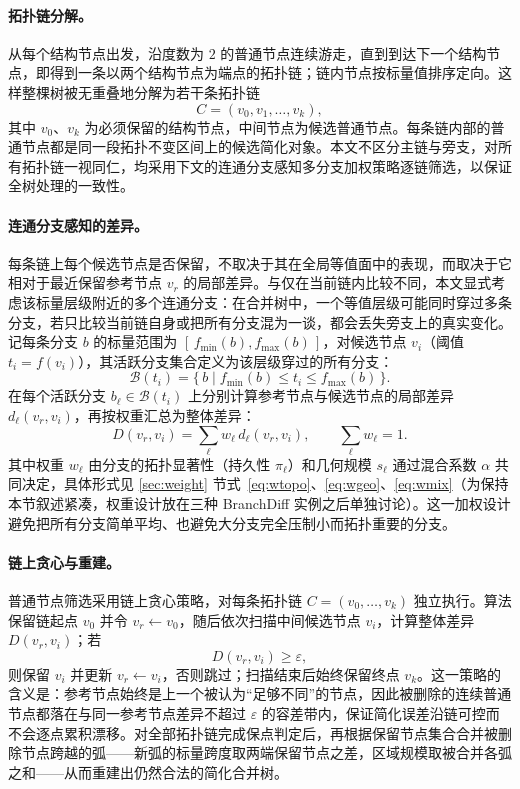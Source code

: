 \documentclass[twocolumn, a4paper, 10pt]{article}
\begin{document}
\paragraph{拓扑链分解。}从每个结构节点出发，沿度数为 $2$ 的普通节点连续游走，直到到达下一个结构节点，即得到一条以两个结构节点为端点的拓扑链；链内节点按标量值排序定向。这样整棵树被无重叠地分解为若干条拓扑链
\begin{equation}
C=(v_0,v_1,\ldots,v_k),
\end{equation}
其中 $v_0$、$v_k$ 为必须保留的结构节点，中间节点为候选普通节点。每条链内部的普通节点都是同一段拓扑不变区间上的候选简化对象。本文不区分主链与旁支，对所有拓扑链一视同仁，均采用下文的连通分支感知多分支加权策略逐链筛选，以保证全树处理的一致性。

\paragraph{连通分支感知的差异。}每条链上每个候选节点是否保留，不取决于其在全局等值面中的表现，而取决于它相对于最近保留参考节点 $v_r$ 的局部差异。与仅在当前链内比较不同，本文显式考虑该标量层级附近的多个连通分支：在合并树中，一个等值层级可能同时穿过多条分支，若只比较当前链自身或把所有分支混为一谈，都会丢失旁支上的真实变化。记每条分支 $b$ 的标量范围为 $[\,f_{\min}(b),f_{\max}(b)\,]$，对候选节点 $v_i$（阈值 $t_i=f(v_i)$），其活跃分支集合定义为该层级穿过的所有分支：
\begin{equation}
\mathcal{B}(t_i)=\{\,b\mid f_{\min}(b)\leq t_i\leq f_{\max}(b)\,\}.
\end{equation}
在每个活跃分支 $b_\ell\in\mathcal{B}(t_i)$ 上分别计算参考节点与候选节点的局部差异 $d_\ell(v_r,v_i)$，再按权重汇总为整体差异：
\begin{equation}
D(v_r,v_i)=\sum_{\ell}w_\ell\, d_\ell(v_r,v_i),
\qquad \sum_{\ell}w_\ell=1.
\label{eq:aggregate}
\end{equation}
其中权重 $w_\ell$ 由分支的拓扑显著性（持久性 $\pi_\ell$）和几何规模 $s_\ell$ 通过混合系数 $\alpha$ 共同决定，具体形式见 \ref{sec:weight} 节式~\eqref{eq:wtopo}、\eqref{eq:wgeo}、\eqref{eq:wmix}（为保持本节叙述紧凑，权重设计放在三种 BranchDiff 实例之后单独讨论）。这一加权设计避免把所有分支简单平均、也避免大分支完全压制小而拓扑重要的分支。

\paragraph{链上贪心与重建。}普通节点筛选采用链上贪心策略，对每条拓扑链 $C=(v_0,\ldots,v_k)$ 独立执行。算法保留链起点 $v_0$ 并令 $v_r\leftarrow v_0$，随后依次扫描中间候选节点 $v_i$，计算整体差异 $D(v_r,v_i)$；若
\begin{equation}
D(v_r,v_i)\geq \varepsilon,
\end{equation}
则保留 $v_i$ 并更新 $v_r\leftarrow v_i$，否则跳过；扫描结束后始终保留终点 $v_k$。这一策略的含义是：参考节点始终是上一个被认为“足够不同”的节点，因此被删除的连续普通节点都落在与同一参考节点差异不超过 $\varepsilon$ 的容差带内，保证简化误差沿链可控而不会逐点累积漂移。对全部拓扑链完成保点判定后，再根据保留节点集合合并被删除节点跨越的弧——新弧的标量跨度取两端保留节点之差，区域规模取被合并各弧之和——从而重建出仍然合法的简化合并树。
\end{document}
